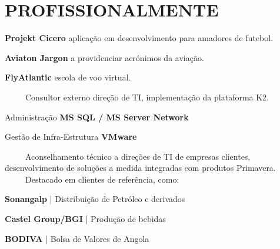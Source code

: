 \documentclass[letterpaper]{deedy-resume} %
\begin{document}
\begin{minipage}[t]{0.66\textwidth}

\section{PROFISSIONALMENTE}


\vspace{\topsep}
\begin{tightitemize}
	\item \textbf{Projekt Cicero} aplicação em desenvolvimento para amadores de futebol.
	\item \textbf{Aviaton Jargon} a providenciar acrónimos da aviação.
	\item \textbf{FlyAtlantic} escola de voo virtual.
\end{tightitemize}


\sectionspace


\-\	\ \ \ \ Consultor externo direção de TI, implementação da plataforma K2. \\

\begin{tightitemize}
	\item Administração \textbf{MS SQL / MS Server Network}
	\item Gestão de Infra-Estrutura \textbf{VMware}
\end{tightitemize}

\sectionspace


\-\	\ \ \ \ Aconselhamento técnico a direções de TI de empresas clientes, desenvolvimento de soluções a medida integradas com produtos Primavera.\\
\-\	\ \ \ \ Destacado em clientes de referência, como:\\
\begin{tightitemize}
	\item \textbf{Sonangalp} | Distribuição de Petróleo e derivados
	\item \textbf{Castel Group/BGI} | Produção de bebidas
	\item \textbf{BODIVA} | Bolsa de Valores de Angola
\end{tightitemize}


\end{minipage}
\end{document}
